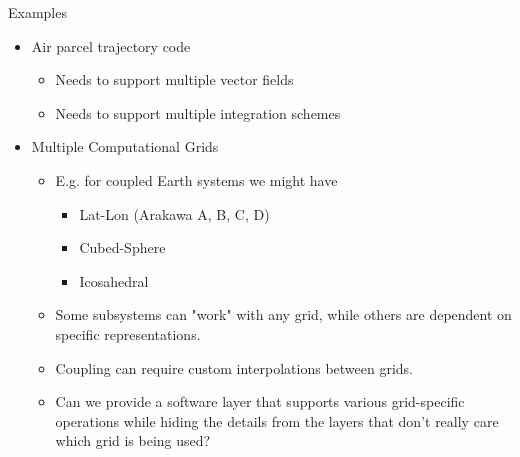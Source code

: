 \documentclass[11pt]{beamer}
\begin{document}

\begin{frame}{Examples}

\begin{itemize}

  \item Air parcel trajectory code
  \begin{itemize}
  \item Needs to support multiple vector fields
  \item Needs to support multiple integration schemes   
  \end{itemize}
  
  \item Multiple Computational Grids

  \begin{itemize}
  \item E.g. for coupled Earth systems we might have
  \begin{itemize}
  \item Lat-Lon (Arakawa A, B, C, D)
  \item Cubed-Sphere
  \item Icosahedral
   \end{itemize}
   \item Some subsystems can "work" with any grid, while others are dependent on specific representations.
   \item Coupling can require custom interpolations between grids.
   \item Can we provide a software layer that supports various grid-specific operations while hiding the details from the layers that don't really care which grid is being used?
   \end{itemize}

 \end{itemize}

\end{frame}


\end{document}
